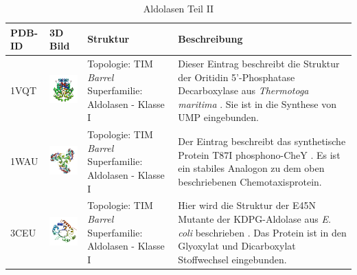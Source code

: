 \documentclass{report}
\begin{document}
\begin{table}
\begin{center}
\caption{Aldolasen Teil II}
\begin{tabular}{ | C{9mm} | C{30mm} | C{29mm} | C{38mm} | }
\hline
PDB-ID & 3D Bild & Struktur & Beschreibung \\ \hline
1VQT  & \includegraphics[width=30mm, trim= -10 -5 -5 -10]{1VQT_bio_r_500.jpg} & Topologie: \newline TIM \textit{Barrel} \newline Superfamilie: Aldolasen - Klasse I & Dieser Eintrag beschreibt die Struktur der Oritidin 5'-Phosphatase Decarboxylase aus \textit{Thermotoga maritima} \cite{1vqt}. Sie ist in die Synthese von UMP eingebunden. \\ \hline
1WAU  & \includegraphics[width=30mm, trim= -10 -5 -5 -10]{1WAU_bio_r_500.jpg} &Topologie: \newline TIM \textit{Barrel} \newline Superfamilie: Aldolasen - Klasse I  & Der Eintrag beschreibt das synthetische Protein T87I phosphono-CheY \cite{2id9}. Es ist ein stabiles Analogon zu dem oben beschriebenen Chemotaxisprotein. \\ \hline
3CEU  & \includegraphics[width=30mm, trim= -10 -5 -5 -10]{3CEU_bio_r_500.jpg}  & Topologie: \newline TIM \textit{Barrel} \newline Superfamilie: Aldolasen - Klasse I & Hier wird die Struktur der E45N Mutante der KDPG-Aldolase aus \textit{E. coli} beschrieben \cite{3ceu}. Das Protein ist in den Glyoxylat und Dicarboxylat Stoffwechsel eingebunden. \\ \hline

\end{tabular}
\end{center}
\end{table}
\end{document}
